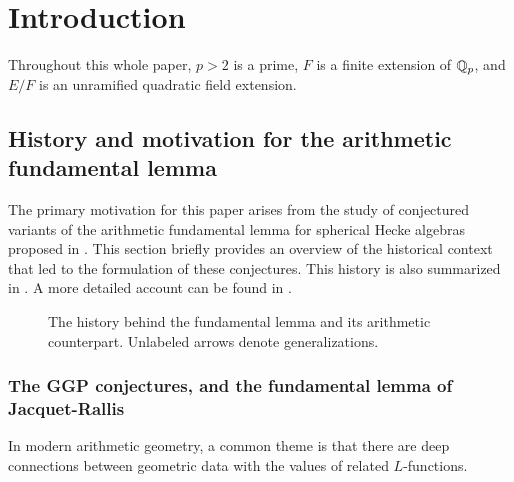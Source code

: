 \section{Introduction}
Throughout this whole paper, $p > 2$ is a prime,
$F$ is a finite extension of $\mathbb Q_p$,
and $E/F$ is an unramified quadratic field extension.

\subsection{History and motivation for the arithmetic fundamental lemma}
The primary motivation for this paper arises from
the study of conjectured variants of the arithmetic fundamental lemma
for spherical Hecke algebras proposed in \cite{ref:AFLspherical}.
This section briefly provides an overview of the historical context
that led to the formulation of these conjectures.
This history is also summarized in .
A more detailed account can be found in \cite{ref:survey}.

\begin{figure}[ht]
  \centering
  \caption{The history behind the fundamental lemma and its arithmetic counterpart.
    Unlabeled arrows denote generalizations.}
  \label{fig:history}
\end{figure}

\subsubsection{The GGP conjectures, and the fundamental lemma of Jacquet-Rallis}
In modern arithmetic geometry, a common theme is that there are deep connections
between geometric data with the values of related $L$-functions.

